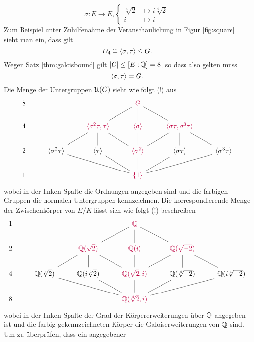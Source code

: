 \documentclass{book}
\begin{document}
\begin{exa}
    \[
        \sigma: E \to E, \begin{cases} \sqrt[4]{2} & \mapsto i\sqrt[4]{2}\\ i & \mapsto i \end{cases}
    \]
    Zum Beispiel unter Zuhilfenahme der Veranschaulichung in Figur \ref{fig:square} sieht man ein, dass gilt
    \[
        D_4 \cong \langle \sigma,\tau \rangle \le G.
    \]
    Wegen Satz \ref{thm:galoisbound} gilt $|G| \le [E:\mathbb{Q}] = 8$, so dass also gelten muss 
    \[
            \langle \sigma,\tau \rangle = G.
    \]
    Die Menge der Untergruppen $\EuScript{U}(G)$ sieht wie folgt (!) aus
    \[
    \begin{tikzcd}
        8  &  & & \color{purple}G \ar[dl,dash]\ar[d,dash]\ar[dr,dash]& &\\
        4  &   & \color{purple} \sk{\sigma^2\tau,  \tau} \ar[dl,dash]\ar[d,dash]\ar[dr,dash] &\color{purple} \sk{\sigma}\ar[d,dash] & \ar[dl,dash]\ar[d,dash]\ar[dr,dash]\color{purple}\sk{\sigma\tau,  \sigma^3\tau} & \\
        2  & \sk{\sigma^2\tau} & \sk{\tau}  &\color{purple} \sk{\sigma^2} & \sk{\sigma\tau} & \sk{\sigma^3\tau}  \\
        1  &                & &\color{purple} \{1 \}\ar[ull,dash] \ar[ul,dash]\ar[u,dash]\ar[ur,dash] \ar[urr,dash]& & 
    \end{tikzcd}
    \]
    wobei in der linken Spalte die Ordnungen angegeben sind und die farbigen
    Gruppen die normalen Untergruppen kennzeichnen. Die korrespondierende Menge
    der Zwischenkörper von $E/K$ lässt sich wie folgt (!) beschreiben
    \[
    \begin{tikzcd}
        1  &  & & \color{purple}\QQ \ar[dl,dash]\ar[d,dash]\ar[dr,dash]& &\\
        2  &   &\color{purple} \QQ(\sqrt{2}) \ar[dl,dash]\ar[d,dash]\ar[dr,dash] &\color{purple} \QQ(i) \ar[d,dash] & \ar[dl,dash]\ar[d,dash]\ar[dr,dash]\color{purple}\QQ(\sqrt{-2}) & \\
        4  & \QQ(\sqrt[4]{2}) & \QQ(i\sqrt[4]{2})  &\color{purple} \QQ(\sqrt{2},i)  & \QQ(\sqrt[4]{-2}) & \QQ(i\sqrt[4]{-2})  \\
        8  &                & &\color{purple} \QQ(\sqrt[4]{2},i) \ar[ull,dash] \ar[ul,dash]\ar[u,dash]\ar[ur,dash] \ar[urr,dash]& & 
    \end{tikzcd}
    \]
    wobei in der linken Spalte der Grad der Körpererweiterungen über $\mathbb{Q}$
    angegeben ist und die farbig gekennzeichneten Körper die
    Galoiserweiterungen von $\mathbb{Q}$ sind. Um zu überprüfen, dass ein angegebener

\end{exa}
\end{document}
